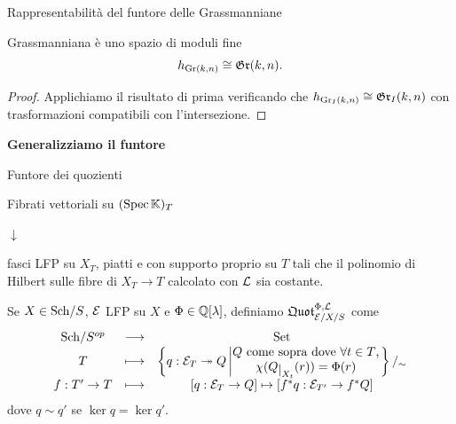 \documentclass[a4paper]{beamer}
\begin{document}
\begin{frame}{Rappresentabilit\`a del funtore delle Grassmanniane}
\begin{alertblock}{Grassmanniana \`e uno spazio di moduli fine}
\[h_{\mathrm{Gr}(k,n)}\cong \mathfrak{Gr}(k,n).\]
\end{alertblock}
\begin{proof}
Applichiamo il risultato di prima verificando che $h_{\mathrm{Gr}_I(k,n)}\cong \mathfrak{Gr}_I(k,n)$ con trasformazioni compatibili con l'intersezione.
\end{proof}
\end{frame}

\begin{frame}{}
\begin{center}
{\huge \textbf{Generalizziamo il funtore} }
\end{center}
\end{frame}

\begin{frame}{Funtore dei quozienti}
\begin{center}
Fibrati vettoriali su $(\mathrm{Spec}\,\mathbb{K})_T$ 

$\downarrow$ 

fasci LFP su $X_T$, piatti e con supporto proprio su $T$ tali che il polinomio di Hilbert sulle fibre di $X_T\to T$ calcolato con $\mathcal{L}$ sia costante.
\end{center}
\pause

Se $X\in{\mathrm{Sch}}/{S}$, $\mathcal{E}$ LFP su $X$ e $\Phi\in \mathbb{Q}[\lambda]$, definiamo $\mathfrak{Quot}^{\Phi,\mathcal{L}}_{\mathcal{E}/X/S}$ come
\[\functorDef{\Sch S\op}{\Set}{T}{\cpa{q:\Ec_T\onto Q\left| \emat{Q\text{ come sopra dove $\forall t\in T$,}\\\chi(Q\res{X_t}(r))=\Phi(r)}\right.}/_\sim}{f:T'\to T}{[q:\Ec_T\to Q]\mapsto [f^\ast q:\Ec_{T'}\to f^\ast Q]}\]
dove $q\sim q'$ se $\ker q=\ker q'$.
\end{frame}
\end{document}
